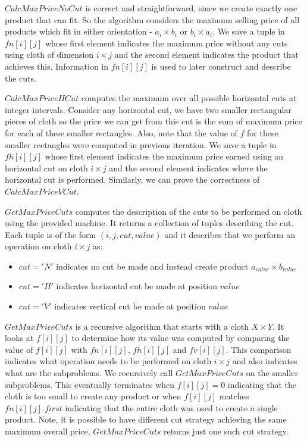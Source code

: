 \documentclass{article}
\begin{document}
    $CalcMaxPriceNoCut$ is correct and straightforward, since we create exactly one product that can fit. So the algorithm considers the maximum selling price of all products which fit in either orientation - $a_i \times b_i$ or $b_i \times a_i$. We save a tuple in $fn[i][j]$ whose first element indicates the maximum price without any cuts using cloth of dimension $i \times j$ and the second element indicates the product that achieves this. Information in $fn[i][j]$ is used to later construct and describe the cuts.

    $CalcMaxPriceHCut$ computes the maximum over all possible horizontal cuts at integer intervals. Consider any horizontal cut, we have two smaller rectangular pieces of cloth so the price we can get from this cut is the sum of maximum price for each of these smaller rectangles. Also, note that the value of $f$ for these smaller rectangles were computed in previous iteration. We save a tuple in $fh[i][j]$ whose first element indicates the maximum price earned using an horizontal cut on cloth $i \times j$ and the second element indicates where the horizontal cut is performed. Similarly, we can prove the correctness of $CalcMaxPriceVCut$.

    $GetMaxPriceCuts$ computes the description of the cuts to be performed on cloth using the provided machine. It returns a collection of tuples describing the cut. Each tuple is of the form $(i, j, cut, value)$ and it describes that we perform an operation on cloth $i \times j$ as:
    \begin{itemize}
        \item $cut = 'N'$ indicates no cut be made and instead create product $a_{value} \times b_{value}$
        \item $cut = 'H'$ indicates horizontal cut be made at position $value$
        \item $cut = 'V'$ indicates vertical cut be made at position $value$
    \end{itemize}
    $GetMaxPriceCuts$ is a recursive algorithm that starts with a cloth $X \times Y$. It looks at $f[i][j]$ to determine how its value was computed by comparing the value of $f[i][j]$ with $fn[i][j]$, $fh[i][j]$ and $fv[i][j]$. This comparison indicates what operation needs to be performed on cloth $i \times j$ and also indicates what are the subproblems. We recursively call $GetMaxPriceCuts$ on the smaller subproblems. This eventually terminates when $f[i][j] = 0$ indicating that the cloth is too small to create any product or when $f[i][j]$ matches $fn[i][j].first$ indicating that the entire cloth was used to create a single product. Note, it is possible to have different cut strategy achieving the same maximum overall price, $GetMaxPriceCuts$ returns just one such cut strategy.
\end{document}

